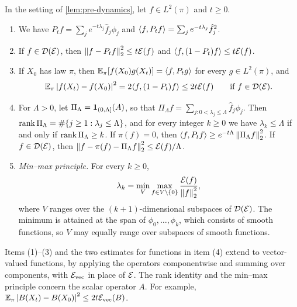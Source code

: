 \begin{lemma}\label{lem:pre-spectral}
In the setting of \cref{lem:pre-dynamics}, let $f\in L^2(\pi)$ and $t\ge0$.
\begin{enumerate}
\item We have $P_tf=\sum_je^{-t\lambda_j}\hat f_j\phi_j$ and $\langle f,P_tf\rangle=\sum_je^{-t\lambda_j}\hat f_j^2$.
\item If $f\in\mathcal D(\mathcal E)$, then $\left\lVert f-P_tf\right\rVert_2^2\le t\mathcal E(f)$ and $\langle f,(1-P_t)f\rangle\le t\mathcal E(f)$.
\item If $X_0$ has law $\pi$, then $\mathbb E_\pi[f(X_0)g(X_t)]=\langle f,P_tg\rangle$ for every $g\in L^2(\pi)$, and
\[
\mathbb E_\pi\left|f(X_t)-f(X_0)\right|^2=2\langle f,(1-P_t)f\rangle\le2t\mathcal E(f)\qquad\text{if }f\in\mathcal D(\mathcal E).
\]
\item For $\Lambda>0$, let $\Pi_\Lambda=\mathbf 1_{(0,\Lambda]}(A)$, so that $\Pi_\Lambda f=\sum_{j:0<\lambda_j\le\Lambda}\hat f_j\phi_j$. Then $\operatorname{rank}\Pi_\Lambda=\#\{j\ge1:\lambda_j\le\Lambda\}$, and for every integer $k\ge0$ we have $\lambda_k\le\Lambda$ if and only if $\operatorname{rank}\Pi_\Lambda\ge k$. If $\pi(f)=0$, then $\langle f,P_tf\rangle\ge e^{-t\Lambda}\left\lVert\Pi_\Lambda f\right\rVert_2^2$. If $f\in\mathcal D(\mathcal E)$, then $\left\lVert f-\pi(f)-\Pi_\Lambda f\right\rVert_2^2\le\mathcal E(f)/\Lambda$.
\item \emph{Min--max principle.} For every $k\ge0$,
\[
\lambda_k=\min_V\max_{f\in V\setminus\{0\}}\frac{\mathcal E(f)}{\left\lVert f\right\rVert_2^2},
\]
where $V$ ranges over the $(k+1)$-dimensional subspaces of $\mathcal D(\mathcal E)$. The minimum is attained at the span of $\phi_0,\dots,\phi_k$, which consists of smooth functions, so $V$ may equally range over subspaces of smooth functions.
\end{enumerate}
Items (1)--(3) and the two estimates for functions in item (4) extend to vector-valued functions, by applying the operators componentwise and summing over components, with $\mathcal E_{\rm vec}$ in place of $\mathcal E$. The rank identity and the min--max principle concern the scalar operator $A$. For example, $\mathbb E_\pi\left|B(X_t)-B(X_0)\right|^2\le2t\mathcal E_{\rm vec}(B)$.
\end{lemma}


